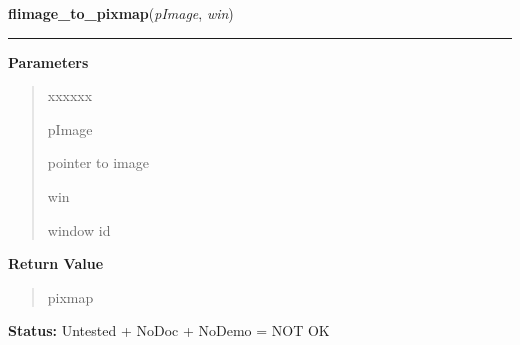 \hspace{.8\funcindent}\begin{boxedminipage}{\funcwidth}

    \raggedright \textbf{flimage\_to\_pixmap}(\textit{pImage}, \textit{win})

    \vspace{-1.5ex}

    \rule{\textwidth}{0.5\fboxrule}
\setlength{\parskip}{2ex}
\setlength{\parskip}{1ex}
      \textbf{Parameters}
      \vspace{-1ex}

      \begin{quote}
        \begin{Ventry}{xxxxxx}

          \item[pImage]

          pointer to image

          \item[win]

          window id

        \end{Ventry}

      \end{quote}

      \textbf{Return Value}
    \vspace{-1ex}

      \begin{quote}
      pixmap

      \end{quote}

\textbf{Status:} Untested + NoDoc + NoDemo = NOT OK



    \end{boxedminipage}

    \label{xformslib:flflimage:flimage_dup}

    \vspace{0.5ex}

